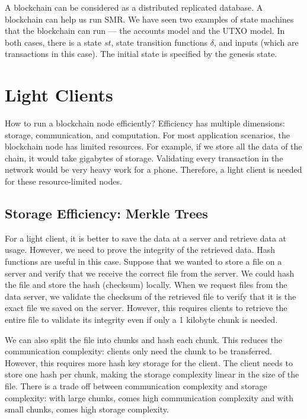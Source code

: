 A blockchain can be considered as a distributed replicated database. A blockchain can help us run SMR. We have seen two examples of state machines that the blockchain can run --- the accounts model and the UTXO model. In both cases, there is a state $st$, state transition functions $\delta$, and inputs (which are transactions in this case). The initial state is specified by the genesis state.

\section{Light Clients}

How to run a blockchain node efficiently? Efficiency has multiple dimensions: storage, communication, and computation. For most application scenarios, the blockchain node has limited resources. For example, if we store all the data of the chain, it would take gigabytes of storage. Validating every transaction in the network would be very heavy work for a phone. Therefore, a light client is needed for these resource-limited nodes.

\subsection{Storage Efficiency: Merkle Trees}

For a light client, it is better to save the data at a server and retrieve data at usage. However, we need to prove the integrity of the retrieved data. Hash functions are useful in this case. Suppose that we wanted to store a file on a server and verify that we receive the correct file from the server. We could hash the file and store the hash (checksum) locally. When we request files from the data server, we validate the checksum of the retrieved file to verify that it is the exact file we saved on the server. However, this requires clients to retrieve the entire file to validate its integrity even if only a 1 kilobyte chunk is needed.

We can also split the file into chunks and hash each chunk. This reduces the communication complexity: clients only need the chunk to be transferred. However, this requires more hash key storage for the client. The client needs to store one hash per chunk, making the storage complexity linear in the size of the file. There is a trade off between communication complexity and storage complexity: with large chunks, comes high communication complexity and with small chunks, comes high storage complexity.

